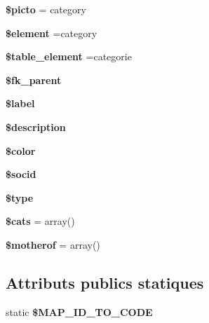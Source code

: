 \begin{DoxyCompactItemize}
{\bfseries \$picto} = \textquotesingle{}category\textquotesingle{}
\item 
\mbox{\label{classCategorie_aee45dc1d47d9b3fb130f94ea4ca80900}} 
{\bfseries \$element} =\textquotesingle{}category\textquotesingle{}
\item 
\mbox{\label{classCategorie_a48bc3791ce064f28e1a93014d0a8fa6d}} 
{\bfseries \$table\+\_\+element} =\textquotesingle{}categorie\textquotesingle{}
\item 
\mbox{\label{classCategorie_a48d5776736769199de5b44e9eab672c8}} 
{\bfseries \$fk\+\_\+parent}
\item 
\mbox{\label{classCategorie_a7423ad3dc7ccd04180c81e8410320634}} 
{\bfseries \$label}
\item 
\mbox{\label{classCategorie_a17201ad77a14a1df86125f4062c10b27}} 
{\bfseries \$description}
\item 
\mbox{\label{classCategorie_ae728a62050b7df6a1c8e9b689d117f48}} 
{\bfseries \$color}
\item 
\mbox{\label{classCategorie_a77ee9d78e000b03e6020d8ceaeb0325b}} 
{\bfseries \$socid}
\item 
\mbox{\label{classCategorie_add32d637425eb5c528d44cc37e1c087f}} 
{\bfseries \$type}
\item 
\mbox{\label{classCategorie_a83d46403ee45c1de77f5b1925981edf0}} 
{\bfseries \$cats} = array()
\item 
\mbox{\label{classCategorie_a205956e394dac95e09b5be821ff1bdf5}} 
{\bfseries \$motherof} = array()
\end{DoxyCompactItemize}
\subsection*{Attributs publics statiques}
\begin{DoxyCompactItemize}
\item 
static {\bfseries \$\+M\+A\+P\+\_\+\+I\+D\+\_\+\+T\+O\+\_\+\+C\+O\+DE}
\end{DoxyCompactItemize}


